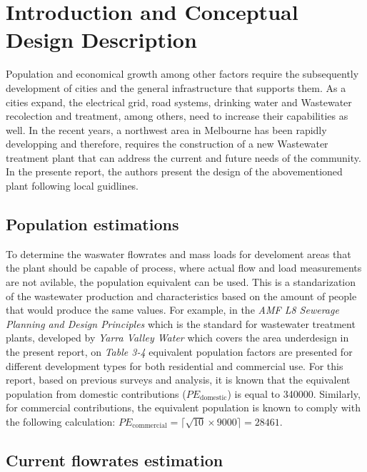 \documentclass[12pt]{article}
\begin{document}
\setcounter{page}{1}
\sloppy

\section{Introduction and Conceptual Design Description}
Population and economical growth among other factors require the subsequently development of cities and the
general infrastructure that supports them. As a cities expand, the electrical grid, road systems, drinking water and Wastewater
recolection and treatment, among others, need to increase their capabilities as well. In the recent years, a northwest area in
Melbourne has been rapidly developping and therefore, requires the construction of a new Wastewater treatment plant that can 
address the current and future needs of the community. In the presente report, the authors present the design of the abovementioned
plant following local guidlines.

\subsection{Population estimations}

To determine the waswater flowrates and mass loads for develoment areas that the plant should be capable of process, 
where actual flow and load
measurements are not avilable, the population equivalent can be used. This is a standarization of the wastewater production
and characteristics based on the amount of people that would produce the same values. For example, in the
\textit{AMF L8 Sewerage Planning and Design Principles}
 which is the standard for wastewater treatment plants, developed by 
 \textit{Yarra Valley Water}
  which covers the area underdesign in the present report, on 
\textit{Table 3-4}
 equivalent population factors are presented for different development types for both residential and commercial use. 
For this report, based on previous surveys and analysis, it is known that the equivalent population from 
domestic contributions (\(PE_{\mathrm{domestic}}\)) is equal to 340000.
Similarly, for commercial contributions, the equivalent population is known to comply with the 
following calculation: 
\(PE_{\mathrm{commercial}}
= \bigl\lceil \sqrt{\text{10}}\times 9000 \bigr\rceil
=  \text{28461} \).

\subsection{Current flowrates estimation}
\end{document}
